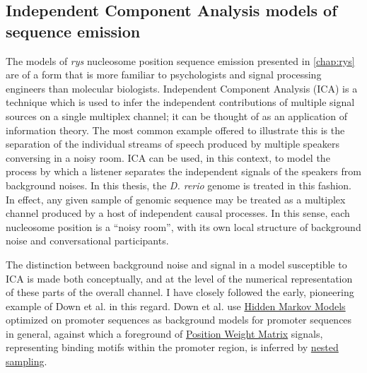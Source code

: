 \subsection{Independent Component Analysis models of sequence emission}
The models of \textit{rys} nucleosome position sequence emission presented in \autoref{chap:rys} are of a form that is more familiar to psychologists and signal processing engineers than molecular biologists. Independent Component Analysis (ICA) is a technique which is used to infer the independent contributions of multiple signal sources on a single multiplex channel; it can be thought of as an application of information theory. The most common example offered to illustrate this is the separation of the individual streams of speech produced by multiple speakers conversing in a noisy room. ICA can be used, in this context, to model the process by which a listener separates the independent signals of the speakers from background noises. In this thesis, the \textit{D. rerio} genome is treated in this fashion. In effect, any given sample of genomic sequence may be treated as a multiplex channel produced by a host of independent causal processes. In this sense, each nucleosome position is a ``noisy room'', with its own local structure of background noise and conversational participants. 

The distinction between background noise and signal in a model susceptible to ICA is made both conceptually, and at the level of the numerical representation of these parts of the overall channel. I have closely followed the early, pioneering example of Down et al. \cite{Down2005} in this regard. Down et al. use \hyperref[ssec:HMM]{Hidden Markov Models} optimized on promoter sequences as background models for promoter sequences in general, against which a foreground of \hyperref[ssec:PWM]{Position Weight Matrix} signals, representing binding motifs within the promoter region, is inferred by \hyperref[ssec:nested]{nested sampling}. 

